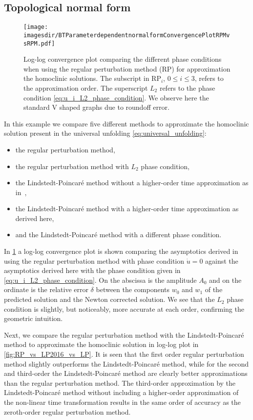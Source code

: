 \subsection{Topological normal form}
\label{sec:topological_normal_form}

\begin{figure}
    \texttt{[image: \\imagesdir/BTParameterdependentnormalformConvergencePlotRPMvsRPM.pdf]}
    \caption{Log-log convergence plot comparing the different phase conditions
        when using the regular perturbation method (RP) for approximation the
        homoclinic solutions. The subscript in RP$_i$, $0\leq i \leq 3$, refers
        to the approximation order. The superscript $L_2$ refers to the phase
        condition \cref{eq:u_i_L2_phase_condition}. We observe here the standard V
        shaped graphs due to roundoff error.} 
    \label{fig:RP_vs_RPL2}
\end{figure}

In this example we compare five different methods to approximate the homoclinic
solution present in the universal unfolding \cref{eq:universal_unfolding}: 
\begin{itemize}
    \item the regular perturbation method, 
    \item the regular perturbation method with $L_2$ phase condition,
    \item the Lindstedt-Poincar\'e method without a higher-order time
        approximation as in~\cite{Al-Hdaibat2016},
    \item the Lindstedt-Poincar\'e method with a higher-order time
        approximation as derived here, 
    \item and the Lindstedt-Poincar\'e method with a different phase condition.
\end{itemize} 

In \cref{fig:RP_vs_RPL2} a log-log convergence plot is shown comparing the
asymptotics derived in~\cite{Al-Hdaibat2016} using the regular perturbation
method with phase condition $\dot u = 0$ against the asymptotics derived here
with the phase condition given in \cref{eq:u_i_L2_phase_condition}.  On the
abscissa is the amplitude $A_0$ and on the ordinate is the relative error
$\delta$ between the components $w_0$ and $w_1$ of the predicted solution and
the Newton corrected solution. We see that the $L_2$ phase condition is
slightly, but noticeably, more accurate at each order, confirming the geometric
intuition.

Next, we compare the regular perturbation method with the Lindstedt-Poincar\'e
method to approximate the homoclinic solution in log-log plot in
\cref{fig:RP_vs_LP2016_vs_LP}.  It is seen that the first order regular
perturbation method slightly outperforms the Lindstedt-Poincar\'e method, while
for the second and third-order the Lindstedt-Poincar\'e method  are clearly
better approximations than the regular perturbation method.  The third-order
approximation by the Lindstedt-Poincar\'e method without including a
higher-order approximation of the non-linear time transformation results in the
same order of accuracy as the zeroth-order regular perturbation method.

